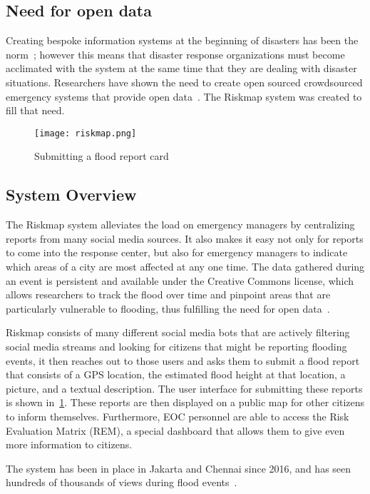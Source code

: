 	\subsection{Need for open data} Creating bespoke information systems at
	the beginning of disasters has been the
	norm~\cite{aminDataNaturalDisasters2008}; however this means that
	disaster response organizations must become acclimated with the system
	at the same time that they are dealing with disaster situations.
	Researchers have shown the need to create open sourced crowdsourced
	emergency systems that provide open
	data~\cite{avvenutiNeedOpeningCrowdsourced2018a}. The Riskmap system was
	created to fill that need.


	\begin{figure} \texttt{[image: riskmap.png]}
	\caption{Submitting a flood report card}\label{fig:cards} \end{figure}
	\subsection{System Overview} The Riskmap system alleviates the load on
	emergency managers by centralizing reports from many social media
	sources. It also makes it easy not only for reports to come into the
	response center, but also for emergency managers to indicate which areas
	of a city are most affected at any one time. The data gathered during an
	event is persistent and available under the Creative Commons license,
	which allows researchers to track the flood over time and pinpoint areas
	that are particularly vulnerable to flooding, thus fulfilling the need
	for open data~\cite{holdernessSocialMediaGeoSocial2015a}.

	Riskmap consists of many different social media bots that are actively
	filtering social media streams and looking for citizens that might be
	reporting flooding events, it then reaches out to those users and asks
	them to submit a flood report that consists of a GPS location, the
	estimated flood height at that location, a picture, and a textual
	description. The user interface for submitting these reports is shown
	in~\ref{fig:cards}. These reports are then displayed on a public map for other
	citizens to inform themselves. Furthermore, EOC personnel are able to
	access the Risk Evaluation Matrix (REM), a special dashboard that allows
	them to give even more information to citizens.

	The system has been in place in Jakarta and Chennai since 2016, and has
	seen hundreds of thousands of views during flood
	events~\cite{noveckOpinionElectionsWon2018, oct31ChennaiGetsRain}.

